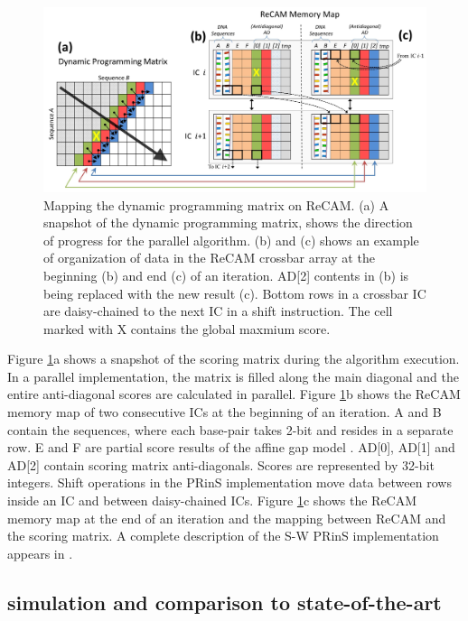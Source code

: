 \documentclass{superfri}
\begin{document}
	\begin{figure}[h!]
		\centerline{\includegraphics[scale=0.6]{Figures/SW_on_ReCAM_Figure.jpg}}
		\caption{Mapping the dynamic programming matrix on ReCAM. (a) A snapshot of the dynamic programming matrix, shows the direction of progress for the parallel algorithm. (b) and (c) shows an example of organization of data in the ReCAM crossbar array at the beginning (b) and end (c) of an iteration. AD[2] contents in (b) is being replaced with the new result (c). Bottom rows in a crossbar IC are daisy-chained to the next IC in a shift instruction. The cell marked with X contains the global maxmium score.}
		\label{fig:SWonReCAM}
	\end{figure}
	
	Figure \ref{fig:SWonReCAM}a shows a snapshot of the scoring matrix during the algorithm execution. In a parallel implementation, the matrix is filled along the main diagonal and the entire anti-diagonal scores are calculated in parallel. Figure \ref{fig:SWonReCAM}b shows the ReCAM memory map of two consecutive ICs at the beginning of an iteration. A and B contain the sequences, where each base-pair takes 2-bit and resides in a separate row. E and F are partial score results of the affine gap model \cite{gotoh1982improved}. AD[0], AD[1] and AD[2] contain scoring matrix anti-diagonals. Scores are represented by 32-bit integers. Shift operations in the PRinS implementation move data between rows inside an IC and between daisy-chained ICs. Figure \ref{fig:SWonReCAM}c shows the ReCAM memory map at the end of an iteration and the mapping between ReCAM and the scoring matrix. A complete description of the S-W PRinS implementation appears in \cite{kaplan2017resistive}.
	
	\subsection{simulation and comparison to state-of-the-art}
	\label{sec:SW_simulation}
	
\end{document}
